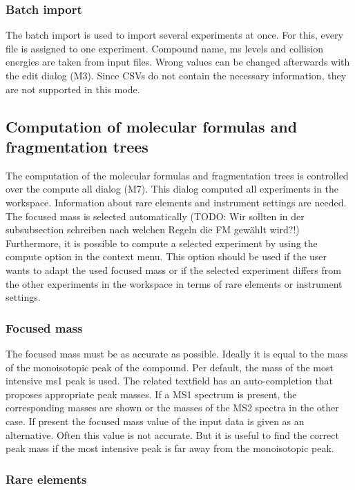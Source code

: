 \documentclass[a4paper,11pt]{article}
\begin{document}
 \subsubsection{Batch import}
 
 The batch import is used to import several experiments at once. For this, every file is assigned to one experiment. 
 Compound name, ms levels and collision energies are taken from input files. Wrong values can be changed afterwards with the edit dialog (M3).  
 Since CSVs do not contain the necessary information, they are not supported in this mode.
 
 \subsection{Computation of molecular formulas and fragmentation trees}
 
 The computation of the molecular formulas and fragmentation trees is controlled over the compute all dialog (M7).
 This dialog computed all experiments in the workspace. Information about rare elements and instrument settings are needed.
 The focused mass is selected automatically (TODO: Wir sollten in der subsubsection schreiben nach welchen Regeln die FM gewählt wird?!)
 Furthermore, it is possible to compute a selected experiment by using the compute option in the context menu.
 This option should be used if the user wants to adapt the used focused mass or if the selected experiment differs from the other experiments in
 the workspace in terms of rare elements or instrument settings.
 
 \subsubsection{Focused mass}
 
 The focused mass must be as accurate as possible. Ideally it is equal to the mass of the monoisotopic peak of the compound. Per default, 
 the mass of the most intensive ms1 peak is used. The related textfield has an auto-completion that proposes appropriate peak masses. 
 If a MS1 spectrum is present, the corresponding masses are shown or the masses of the MS2 spectra in the other case.  
 If present the focused mass value of the input data is given as an alternative.  Often this value is not accurate. 
 But it is useful to find the correct peak mass if the most intensive peak is far away from the monoisotopic peak.
 
 \subsubsection{Rare elements}
 
\end{document}
